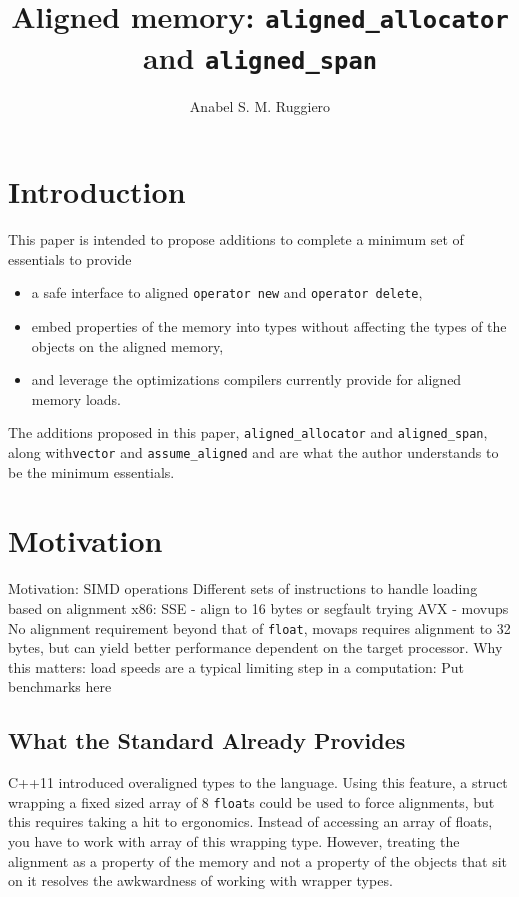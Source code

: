 \documentclass[11pt]{article}
\title{Aligned memory: \texttt{aligned\_allocator} and \texttt{aligned\_span}}
\author{Anabel S. M. Ruggiero}
\begin{document}
\maketitle

\section{Introduction}\label{intro}

This paper is intended to propose additions to complete a minimum set of essentials to provide 

\begin{itemize}
\item a safe interface to aligned \texttt{operator new} and \texttt{operator delete},
\item embed properties of the memory into types without affecting the types of the objects on the aligned memory,
\item and leverage the optimizations compilers currently provide for aligned memory loads.
\end{itemize}

The additions proposed in this paper, \texttt{aligned\_allocator} and \texttt{aligned\_span}, along with\texttt{vector} and \texttt{assume\_aligned} and are what the author understands to be the minimum essentials.

\section{Motivation}
Motivation: SIMD operations
	Different sets of instructions to handle loading based on alignment
		x86:
			SSE - align to 16 bytes or segfault trying
			AVX - movups No alignment requirement beyond that of \texttt{float},  movaps requires alignment to 32 bytes, but can yield better performance dependent on the target processor.
	Why this matters:
		load speeds are a typical limiting step in a computation:
			Put benchmarks here
			
\subsection{What the Standard Already Provides}
C++11 introduced overaligned types to the language. Using this feature, a struct wrapping a fixed sized array of 8 \texttt{float}s could be used to force alignments, but this requires taking a hit to ergonomics. Instead of accessing an array of floats, you have to work with array of this wrapping type. However, treating the alignment as a property of the memory and not a property of the objects that sit on it resolves the awkwardness of working with wrapper types.
\end{document}
